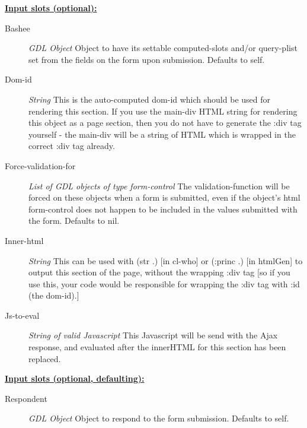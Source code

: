 \documentclass [11pt]{book}
\begin{document}
\begin{itemize}
\textbf{
\underline{Input slots (optional):}}

\begin{description}

\item [Bashee]
\emph{GDL Object} Object to have its settable computed-slots and/or query-plist set
from the fields on the form upon submission. Defaults to self.


\item [Dom-id]
\emph{String} This is the auto-computed dom-id which should be used for rendering
this section. If you use the main-div HTML string for rendering this object as a
page section, then you do not have to generate the :div tag yourself - the main-div
will be a string of HTML which is wrapped in the correct :div tag already.


\item [Force-validation-for]
\emph{List of GDL objects of type form-control} The validation-function will be forced
on these objects when a form is submitted, even if the object's html form-control does
not happen to be included in the values submitted with the form. Defaults to nil.


\item [Inner-html]
\emph{String} This can be used with (str .) [in cl-who] or (:princ .) [in htmlGen]
to output this section of the page, without the wrapping :div tag [so if you use this,
your code would be responsible for wrapping the :div tag with :id (the dom-id).]


\item [Js-to-eval]
\emph{String of valid Javascript} This Javascript will be send with the Ajax response,
and evaluated after the innerHTML for this section has been replaced.


\end{description}






\textbf{
\underline{Input slots (optional, defaulting):}}

\begin{description}

\item [Respondent]
\emph{GDL Object} Object to respond to the form submission. Defaults to self.



\end{description}
\end{itemize}
\end{document}
